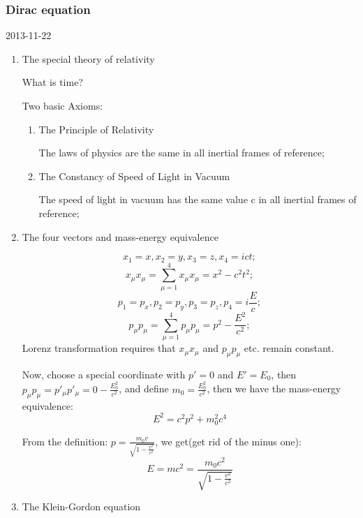 \documentclass[12pt]{article}
\numberwithin{equation}{section}
\begin{document}
\subsubsection{Dirac equation}
2013-11-22
\begin{enumerate}
\item The special theory of relativity\par
	What is time?\par
	Two basic Axioms:
	\begin{enumerate}
		\item The Principle of Relativity\par
		The laws of physics are the same in all inertial frames of reference;
		\item The Constancy of Speed of Light in Vacuum\par
		The speed of light in vacuum has the same value c in all inertial frames of reference;			\end{enumerate}
\item The four vectors and mass-energy equivalence \par
	\begin{equation}x_1=x, x_2=y, x_3=z, x_4=ict;\end{equation}
	\begin{equation}x_\mu x_\mu = \sum_{\mu=1}^{4} x_\mu x_\mu = x^2-c^2 t^2; \end{equation}
	\begin{equation}p_1=p_x, p_2=p_y, p_3=p_z, p_4=i\frac{E}{c};\end{equation}
	\begin{equation}p_\mu p_\mu = \sum_{\mu=1}^{4} p_\mu p_\mu = p^2-\frac{E^2}{c^2};\end{equation}
	Lorenz transformation requires that $x_\mu x_\mu$ and $p_\mu p_\mu$ etc. remain constant.\par
	Now, choose a special coordinate with $p'=0$ and $E'=E_0$, then 
	$p_\mu p_\mu=p'_\mu p'_\mu=0-\frac{E_0^2}{c^2}$, and define $m_0=\frac{E_0^2}{c^2}$, 
	then we have the mass-energy equivalence:
	\begin{equation}
		E^2=c^2p^2+m_0^2c^4
	\end{equation} \par
	From the definition: $p=\frac{m_0v}{\sqrt{1-\frac{v^2}{c^2}}}$, we get(get rid of the minus one):
	\begin{equation}
		E=mc^2=\frac{m_0c^2}{\sqrt{1-\frac{v^2}{c^2}}}
	\end{equation}
\item The Klein-Gordon equation \par

\end{enumerate}
\end{document}
